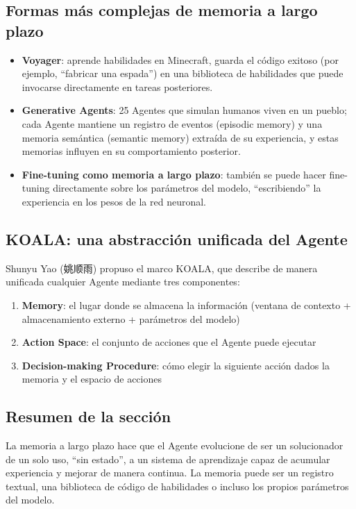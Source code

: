 \documentclass[a4paper]{article}
\begin{document}
\subsection{Formas más complejas de memoria a largo plazo}

\begin{itemize}
    \item \textbf{Voyager}: aprende habilidades en Minecraft, guarda el código exitoso (por ejemplo, ``fabricar una espada'') en una biblioteca de habilidades que puede invocarse directamente en tareas posteriores.
    \item \textbf{Generative Agents}: 25 Agentes que simulan humanos viven en un pueblo; cada Agente mantiene un registro de eventos (episodic memory) y una memoria semántica (semantic memory) extraída de su experiencia, y estas memorias influyen en su comportamiento posterior.
    \item \textbf{Fine-tuning como memoria a largo plazo}: también se puede hacer fine-tuning directamente sobre los parámetros del modelo, ``escribiendo'' la experiencia en los pesos de la red neuronal.
\end{itemize}

\subsection{KOALA: una abstracción unificada del Agente}

Shunyu Yao (姚顺雨) propuso el marco KOALA, que describe de manera unificada cualquier Agente mediante tres componentes:

\begin{enumerate}
    \item \textbf{Memory}: el lugar donde se almacena la información (ventana de contexto + almacenamiento externo + parámetros del modelo)
    \item \textbf{Action Space}: el conjunto de acciones que el Agente puede ejecutar
    \item \textbf{Decision-making Procedure}: cómo elegir la siguiente acción dados la memoria y el espacio de acciones
\end{enumerate}

\subsection{Resumen de la sección}

La memoria a largo plazo hace que el Agente evolucione de ser un solucionador de un solo uso, ``sin estado'', a un sistema de aprendizaje capaz de acumular experiencia y mejorar de manera continua. La memoria puede ser un registro textual, una biblioteca de código de habilidades o incluso los propios parámetros del modelo.
\end{document}
